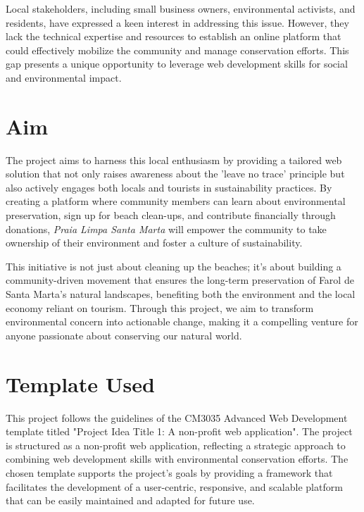     Local stakeholders, including small business owners, environmental activists, and residents, have expressed a keen interest in addressing this issue. However, they lack the technical expertise and resources to establish an online platform that could effectively mobilize the community and manage conservation efforts. This gap presents a unique opportunity to leverage web development skills for social and environmental impact.


\section{Aim}

    The project aims to harness this local enthusiasm by providing a tailored web solution that not only raises awareness about the 'leave no trace' principle but also actively engages both locals and tourists in sustainability practices. By creating a platform where community members can learn about environmental preservation, sign up for beach clean-ups, and contribute financially through donations, \textit{Praia Limpa Santa Marta} will empower the community to take ownership of their environment and foster a culture of sustainability.

    This initiative is not just about cleaning up the beaches; it's about building a community-driven movement that ensures the long-term preservation of Farol de Santa Marta's natural landscapes, benefiting both the environment and the local economy reliant on tourism. Through this project, we aim to transform environmental concern into actionable change, making it a compelling venture for anyone passionate about conserving our natural world.

\section{Template Used}


    This project follows the guidelines of the CM3035 Advanced Web Development template titled "Project Idea Title 1: A non-profit web application". The project is structured as a non-profit web application, reflecting a strategic approach to combining web development skills with environmental conservation efforts. The chosen template supports the project's goals by providing a framework that facilitates the development of a user-centric, responsive, and scalable platform that can be easily maintained and adapted for future use.
